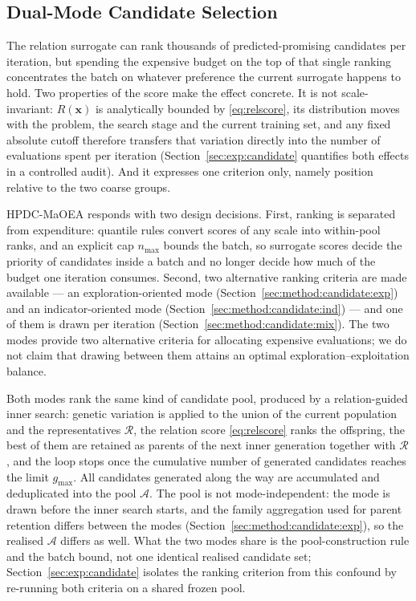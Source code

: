 \documentclass[final,5p,times,twocolumn]{elsarticle}
\newcommand{\vx}{\mathbf{x}}
\begin{document}
\subsection{Dual-Mode Candidate Selection}
\label{sec:method:candidate}

The relation surrogate can rank thousands of predicted-promising candidates per
iteration, but spending the expensive budget on the top of that single ranking
concentrates the batch on whatever preference the current surrogate happens to
hold. Two properties of the score make the effect concrete. It is not
scale-invariant: $R(\vx)$ is analytically bounded by \eqref{eq:relscore}, its
distribution moves with the problem, the search stage and the current training
set, and any fixed absolute cutoff therefore transfers that variation directly
into the number of evaluations spent per iteration
(Section~\ref{sec:exp:candidate} quantifies both effects in a controlled audit).
And it expresses one criterion only, namely position relative to the two coarse
groups.

HPDC-MaOEA responds with two design decisions. First, ranking is separated from
expenditure: quantile rules convert scores of any scale into within-pool ranks,
and an explicit cap $n_{\max}$ bounds the batch, so surrogate
scores decide the priority of candidates inside a batch and no longer decide how
much of the budget one iteration consumes. Second, two alternative ranking
criteria are made available --- an exploration-oriented mode
(Section~\ref{sec:method:candidate:exp}) and an indicator-oriented mode
(Section~\ref{sec:method:candidate:ind}) --- and one of them is drawn per
iteration (Section~\ref{sec:method:candidate:mix}). The two modes provide two
alternative criteria for allocating expensive evaluations; we do not claim that
drawing between them attains an optimal exploration--exploitation balance.

Both modes rank the same kind of candidate pool, produced by a relation-guided
inner search: genetic variation is applied to the union of the current
population and the representatives $\mathcal{R}$, the relation score
\eqref{eq:relscore} ranks the offspring, the best of them are retained as
parents of the next inner generation together with $\mathcal{R}$, and the loop
stops once the cumulative number of generated candidates reaches the limit
$g_{\max}$. All candidates generated along the way are accumulated and
deduplicated into the pool $\mathcal{A}$. The pool is not mode-independent: the
mode is drawn before the inner search starts, and the family aggregation used
for parent retention differs between the modes
(Section~\ref{sec:method:candidate:exp}), so the realised $\mathcal{A}$ differs
as well. What the two modes share is the pool-construction rule and the batch
bound, not one identical realised candidate set;
Section~\ref{sec:exp:candidate} isolates the ranking criterion from this
confound by re-running both criteria on a shared frozen pool.
\end{document}
